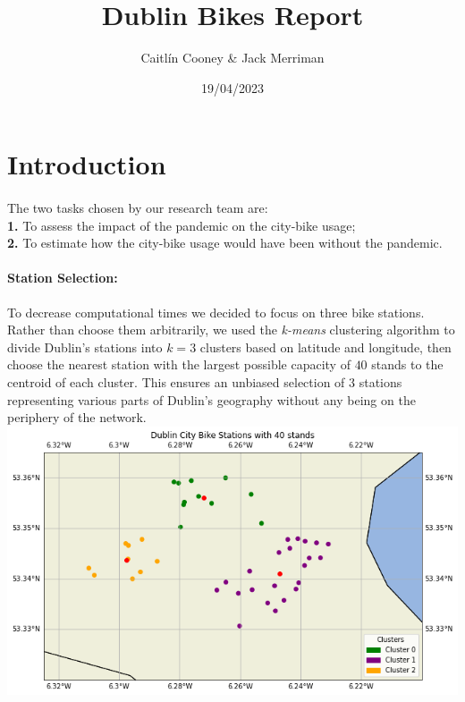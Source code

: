 \documentclass[12pt,letterpaper]{article}
\title{Dublin Bikes Report}
\date{19/04/2023}
\author{Caitlín Cooney \& Jack Merriman}
\begin{document}
\maketitle

	\section{Introduction}
	
	\paragraph{}
	\noindent The two tasks chosen by our research team are:\\
	\textbf{1.} To assess the impact of the pandemic on the city-bike usage;\\
	\textbf{2.} To estimate how the city-bike usage would have been without the pandemic.\\
	
	\paragraph{Station Selection:}
	To decrease computational times we decided to focus on three bike stations. Rather than choose them arbitrarily, we used the \textit{k-means} clustering algorithm to divide Dublin's stations into $k = 3$ clusters based on latitude and longitude, then choose the nearest station with the largest possible capacity of $40$ stands to the centroid of each cluster. This ensures an unbiased selection of 3 stations representing various parts of Dublin's geography without any being on the periphery of the network.\\
	
	\includegraphics[width=\textwidth]{kmeans.png}
	
	
	
	
\end{document}
